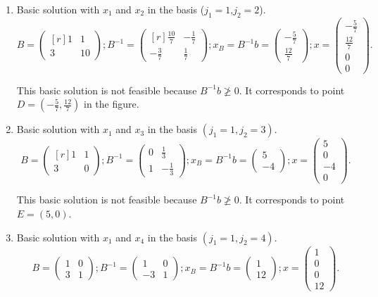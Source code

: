 \begin{enumerate}

\item Basic solution with $x_1$ and $x_2$ in the basis ($j_1=1$,$j_2=2$).
\[
B = 
\begin{pmatrix*}[r]
1 & 1\\
3 &10
\end{pmatrix*};
B^{-1} =
\begin{pmatrix*}[r]
\frac{10}{7} & -\frac{1}{7}\\
-\frac{3}{7} &\frac{1}{7}
\end{pmatrix*};
x_B = B^{-1}b =
\begin{pmatrix}
-\frac{5}{7} \\
\frac{12}{7}
\end{pmatrix};
x =
\begin{pmatrix}
-\frac{5}{7} \\
\frac{12}{7} \\
0 \\
0
\end{pmatrix}.
\]

This basic solution is not feasible because $B^{-1}b\ngeqslant0$. It corresponds to point $D=(-\frac{5}{7},\frac{12}{7})$ in the figure.

\item Basic solution with $x_1$ and $x_3$ in the basis $(j_1=1,j_2=3)$.
\[
B = 
\begin{pmatrix*}[r]
1 & 1\\
3 &0
\end{pmatrix*};
B^{-1} =
\begin{pmatrix*}
0 & \frac{1}{3}\\
1 & -\frac{1}{3}
\end{pmatrix*};
x_B = B^{-1}b =
\begin{pmatrix}
5 \\
-4
\end{pmatrix};
x =
\begin{pmatrix}
5 \\
0 \\
-4 \\
0
\end{pmatrix}.
\]

This basic solution is not feasible because $B^{-1}b\ngeqslant0$. It corresponds to point $E=(5,0)$.

\item Basic solution with $x_1$ and $x_4$ in the basis $(j_1=1,j_2=4)$.
\[
B = 
\begin{pmatrix}
1 & 0\\
3 &1
\end{pmatrix};
B^{-1} =
\begin{pmatrix*}
1 & 0\\
-3 & 1
\end{pmatrix*};
x_B = B^{-1}b =
\begin{pmatrix}
1 \\
12
\end{pmatrix};
x =
\begin{pmatrix}
1 \\
0 \\
0 \\
12
\end{pmatrix}.
\]


\end{enumerate}
